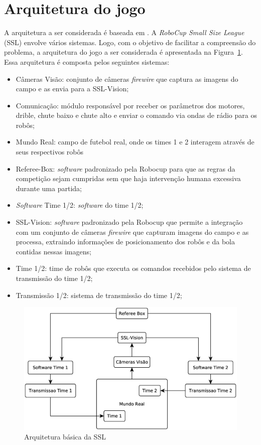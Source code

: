 \section{Arquitetura do jogo}\label{sec:arch_ssl}

A arquitetura a ser considerada é baseada em \cite{felixnavarro}.
A \textit{RoboCup Small Size League} (SSL) envolve vários sistemas.
Logo, com o objetivo de facilitar a compreensão do problema, a
arquitetura do jogo a ser considerada é apresentada na
Figura~\ref{fig:arquitetura_ssl}. Essa arquitetura é composta pelos
seguintes sistemas:

\begin{itemize}
  \item Câmeras Visão: conjunto de câmeras \textit{firewire} que captura as imagens do
        campo e as envia para a SSL-Vision;
  \item Comunicação: módulo responsável por receber os parâmetros
        dos motores, drible, chute baixo e chute alto e enviar o comando via
        ondas de rádio para os robôs;
  \item Mundo Real: campo de futebol real, onde os times 1 e 2 interagem
        através de seus respectivos robôs
  \item Referee-Box: \textit{software} padronizado pela Robocup para que as
        regras da competição sejam cumpridas sem que haja intervenção
        humana excessiva durante uma partida;
  \item \textit{Software} Time 1/2: \textit{software} do time 1/2;
  \item SSL-Vision: \textit{software} padronizado pela Robocup que permite a
        integração com um conjunto de câmeras \textit{firewire} que capturam
        imagens do campo e as processa, extraindo informações de posicionamento
        dos robôs e da bola contidas nessas imagens;
  \item Time 1/2: time de robôs que executa os comandos recebidos pelo
        sistema de transmissão do time 1/2;
  \item Transmissão 1/2: sistema de transmissão do time 1/2;
\end{itemize}

\begin{figure}[thpb]
  \centering
  \includegraphics[width= 0.8\linewidth]{img/arq_ssl}
  \caption{Arquitetura básica da SSL}\label{fig:arquitetura_ssl}
\end{figure}

